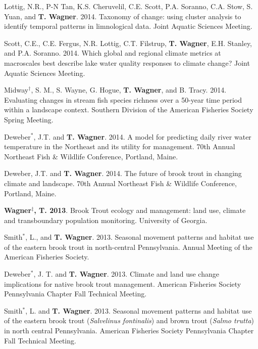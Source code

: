 \documentclass[10pt]{article}
\begin{document}
\begin{flushleft}
\begin{etaremune}
\item Lottig, N.R., P-N Tan, K.S. Cheruvelil, C.E. Scott, P.A. Soranno, C.A. Stow, S. Yuan, and {\bf T. Wagner}. 2014. Taxonomy of change: using cluster analysis to identify temporal patterns in limnological data. Joint Aquatic Sciences Meeting. 

\item Scott, C.E., C.E. Fergus, N.R. Lottig, C.T. Filstrup, {\bf T. Wagner}, E.H. Stanley, and P.A. Soranno. 2014. Which global and regional climate metrics at macroscales best describe lake water quality responses to climate change? Joint Aquatic Sciences Meeting. 

\item Midway$^\dagger$, S. M., S. Wayne, G. Hogue, {\bf T. Wagner}, and B. Tracy. 2014. Evaluating changes in stream fish species richness over a 50-year time period within a landscape context. Southern Division of the American Fisheries Society Spring Meeting. 

\item Deweber$^*$, J.T. and {\bf T. Wagner}. 2014. A model for predicting daily river water temperature in the Northeast and its utility for management. 70th Annual Northeast Fish \& Wildlife Conference, Portland, Maine.

\item Deweber, J.T. and  {\bf T. Wagner}. 2014. The future of brook trout in changing climate and landscape. 70th Annual Northeast Fish \& Wildlife Conference, Portland, Maine.


\item {\bf Wagner$^\ddagger$, T. 2013}. Brook Trout ecology and management: land use, climate and transboundary population monitoring. University of Georgia. 

\item Smith$^*$, L., and {\bf T. Wagner}. 2013. Seasonal movement patterns and habitat use of the eastern brook trout in north-central Pennsylvania. Annual Meeting of the American Fisheries Society. 

\item Deweber$^*$, J. T. and {\bf T. Wagner}. 2013. Climate and land use change implications for native brook trout management. American Fisheries Society Pennsylvania Chapter Fall Technical Meeting.

\item Smith$^*$, L. and {\bf T. Wagner}. 2013. Seasonal movement patterns and habitat use of the eastern brook trout (\emph{Salvelinus fontinalis}) and brown trout (\emph{Salmo trutta}) in north central Pennsylvania. American Fisheries Society Pennsylvania Chapter Fall Technical Meeting. 


\end{etaremune}
\end{flushleft}
\end{document}
